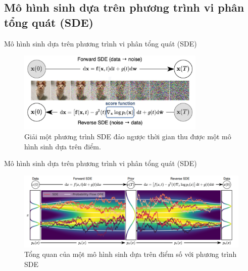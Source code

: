 \documentclass[10pt]{beamer}
\theoremstyle{remark}
\numberwithin{algocf}{section}
\numberwithin{equation}{section}
\numberwithin{dl}{section}
\numberwithin{figure}{section}
\begin{document}
\subsection{Mô hình sinh dựa trên phương trình vi phân tổng quát (SDE)}

\begin{frame}{Mô hình sinh dựa trên phương trình vi phân tổng quát (SDE)}
	\begin{figure}[H]
		\centering
		\includegraphics[width=0.8\textwidth]{1.jpg}
		\caption{Giải một phương trình SDE đảo ngược thời gian thu được một mô hình sinh dựa trên điểm.}
		\label{fig:1}
	\end{figure}
\end{frame}

\begin{frame}{Mô hình sinh dựa trên phương trình vi phân tổng quát (SDE)}
	\begin{figure}[H]
		\centering
		\includegraphics[width=\textwidth]{2.png}
		\caption{Tổng quan của một mô hình sinh dựa trên điểm số với phương trình SDE}
		\label{fig:2}
	\end{figure}
\end{frame}
\end{document}
